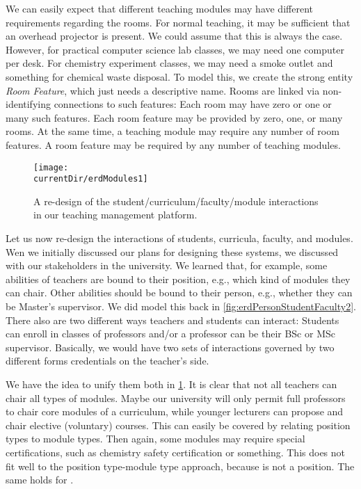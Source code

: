 We can easily expect that different teaching modules may have different requirements regarding the rooms.
For normal teaching, it may be sufficient that an overhead projector is present.
We could assume that this is always the case.
However, for practical computer science lab classes, we may need one computer per desk.
For chemistry experiment classes, we may need a smoke outlet and something for chemical waste disposal.
To model this, we create the strong entity \emph{Room Feature}, which just needs a descriptive name.
Rooms are linked via non-identifying connections to such features:
Each room may have zero or one or many such features.
Each room feature may be provided by zero, one, or many rooms.
At the same time, a teaching module may require any number of room features.
A room feature may be required by any number of teaching modules.

\begin{figure}%
\centering%
\texttt{[image: \\currentDir/erdModules1]}%
\caption{A re-design of the student/curriculum/faculty/module interactions in our teaching management platform.}%
\label{fig:erdModules1}%
\end{figure}%
%
Let us now re-design the interactions of students, curricula, faculty, and modules.
Wen we initially discussed our plans for designing these systems, we discussed with our stakeholders in the university.
We learned that, for example, some abilities of teachers are bound to their position, e.g., which kind of modules they can chair.
Other abilities should be bound to their person, e.g., whether they can be Master's supervisor.
We did model this back in \cref{fig:erdPersonStudentFaculty2}.
There also are two different ways teachers and students can interact:
Students can enroll in classes of professors and/or a professor can be their BSc or MSc supervisor.
Basically, we would have two sets of interactions governed by two different forms credentials on the teacher's side.

We have the idea to unify them both in \cref{fig:erdModules1}.
It is clear that not all teachers can chair all types of modules.
Maybe our university will only permit full professors to chair core modules of a curriculum, while younger lecturers can propose and chair elective (voluntary) courses.
This can easily be covered by relating position types to module types.
Then again, some modules may require special certifications, such as chemistry safety certification or something.
This does not fit well to the position type-module type approach, because  is not a position.
The same holds for .


